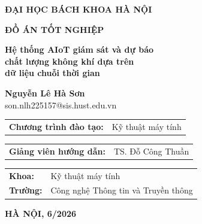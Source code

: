 \begin{titlepage}
\begin{center}

{\large\bfseries ĐẠI HỌC BÁCH KHOA HÀ NỘI}

\vspace{0.8cm}
{\Large\bfseries ĐỒ ÁN TỐT NGHIỆP}

\vspace{1.5cm}
{\LARGE\bfseries
Hệ thống AIoT giám sát và dự báo\\[6pt]
chất lượng không khí dựa trên\\[6pt]
dữ liệu chuỗi thời gian
}

\vspace{1.8cm}

{\large\bfseries Nguyễn Lê Hà Sơn}\\[4pt]
{\normalsize son.nlh225157@sis.hust.edu.vn}

\vspace{1.2cm}
\begin{tabular}{ll}
\textbf{Chương trình đào tạo:} & Kỹ thuật máy tính \\[4pt]
\end{tabular}

\vspace{1.2cm}
\begin{tabular}{ll}
\textbf{Giảng viên hướng dẫn:} & TS. Đỗ Công Thuần\\[4pt]
\end{tabular}

\vspace{0.5cm}
\begin{tabular}{ll}
\textbf{Khoa:} & Kỹ thuật máy tính \\[4pt]
\textbf{Trường:} & Công nghệ Thông tin và Truyền thông \\
\end{tabular}

\vfill
{\large\bfseries HÀ NỘI, 6/2026}

\end{center}
\end{titlepage}
